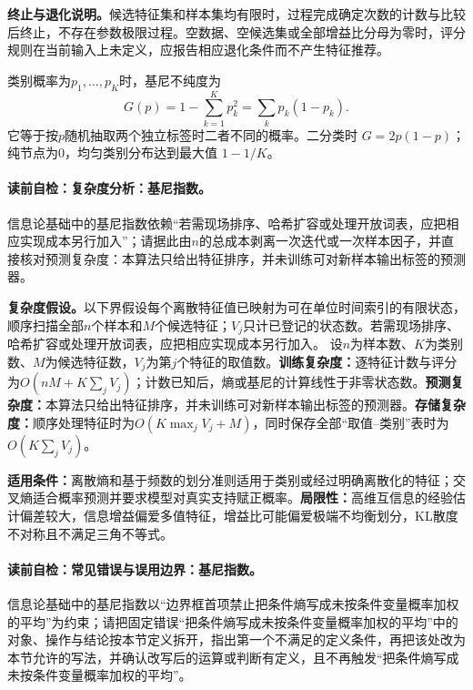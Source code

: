 \textbf{终止与退化说明。}候选特征集和样本集均有限时，过程完成确定次数的计数与比较后终止，不存在参数极限过程。空数据、空候选集或全部增益比分母为零时，评分规则在当前输入上未定义，应报告相应退化条件而不产生特征推荐。


类别概率为$p_1,\ldots,p_K$时，基尼不纯度为
\[
G(p)=1-\sum_{k=1}^{K}p_k^2=\sum_kp_k(1-p_k).
\]
它等于按$p$随机抽取两个独立标签时二者不同的概率。二分类时 $G=2p(1-p)$；纯节点为0，均匀类别分布达到最大值 $1-1/K$。


\label{struct:V1-C06-CH28}
\label{struct:V1-C06-CH29}
\paragraph{读前自检：复杂度分析：基尼指数。}信息论基础中的基尼指数依赖“若需现场排序、哈希扩容或处理开放词表，应把相应实现成本另行加入”；请据此由$n$的总成本剥离一次迭代或一次样本因子，并直接核对预测复杂度：本算法只给出特征排序，并未训练可对新样本输出标签的预测器。\par

\begin{complexitybox}
\textbf{复杂度假设。}以下界假设每个离散特征值已映射为可在单位时间索引的有限状态，顺序扫描全部$n$个样本和$M$个候选特征；$V_j$只计已登记的状态数。若需现场排序、哈希扩容或处理开放词表，应把相应实现成本另行加入。
设$n$为样本数、$K$为类别数、$M$为候选特征数，$V_j$为第$j$个特征的取值数。\textbf{训练复杂度：}逐特征计数与评分为$O(nM+K\sum_jV_j)$；计数已知后，熵或基尼的计算线性于非零状态数。\textbf{预测复杂度：}本算法只给出特征排序，并未训练可对新样本输出标签的预测器。\textbf{存储复杂度：}顺序处理特征时为$O(K\max_jV_j+M)$，同时保存全部“取值--类别”表时为$O(K\sum_jV_j)$。
\end{complexitybox}

\label{struct:V1-C06-CH30}
\label{struct:V1-C06-CH31}
\begin{applicabilitybox}
\textbf{适用条件：}离散熵和基于频数的划分准则适用于类别或经过明确离散化的特征；交叉熵适合概率预测并要求模型对真实支持赋正概率。\textbf{局限性：}高维互信息的经验估计偏差较大，信息增益偏爱多值特征，增益比可能偏爱极端不均衡划分，KL散度不对称且不满足三角不等式。
\end{applicabilitybox}

\label{struct:V1-C06-CH32}
\paragraph{读前自检：常见错误与误用边界：基尼指数。}信息论基础中的基尼指数以“边界框首项禁止把条件熵写成未按条件变量概率加权的平均”为约束；请把固定错误“把条件熵写成未按条件变量概率加权的平均”中的对象、操作与结论按本节定义拆开，指出第一个不满足的定义条件，再把该处改为本节允许的写法，并确认改写后的运算或判断有定义，且不再触发“把条件熵写成未按条件变量概率加权的平均”。\par

